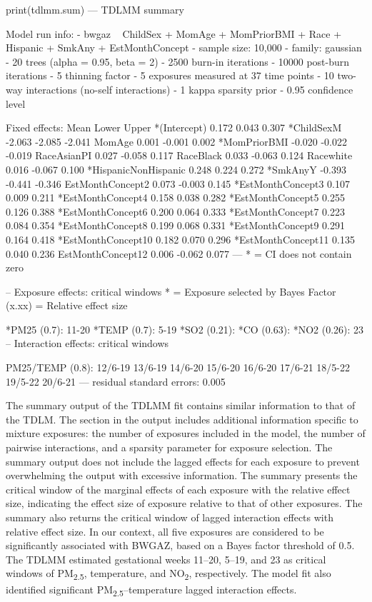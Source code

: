 \begin{example}
print(tdlmm.sum)
---
TDLMM summary

Model run info:
- bwgaz ~ ChildSex + MomAge + MomPriorBMI + Race + Hispanic + SmkAny + EstMonthConcept
- sample size: 10,000
- family: gaussian
- 20 trees (alpha = 0.95, beta = 2)
- 2500 burn-in iterations
- 10000 post-burn iterations
- 5 thinning factor
- 5 exposures measured at 37 time points
- 10 two-way interactions (no-self interactions)
- 1 kappa sparsity prior
- 0.95 confidence level

Fixed effects:
                       Mean  Lower  Upper
*(Intercept)          0.172  0.043  0.307
*ChildSexM           -2.063 -2.085 -2.041
 MomAge               0.001 -0.001  0.002
*MomPriorBMI         -0.020 -0.022 -0.019
 RaceAsianPI          0.027 -0.058  0.117
 RaceBlack            0.033 -0.063  0.124
 Racewhite            0.016 -0.067  0.100
*HispanicNonHispanic  0.248  0.224  0.272
*SmkAnyY             -0.393 -0.441 -0.346
 EstMonthConcept2     0.073 -0.003  0.145
*EstMonthConcept3     0.107  0.009  0.211
*EstMonthConcept4     0.158  0.038  0.282
*EstMonthConcept5     0.255  0.126  0.388
*EstMonthConcept6     0.200  0.064  0.333
*EstMonthConcept7     0.223  0.084  0.354
*EstMonthConcept8     0.199  0.068  0.331
*EstMonthConcept9     0.291  0.164  0.418
*EstMonthConcept10    0.182  0.070  0.296
*EstMonthConcept11    0.135  0.040  0.236
 EstMonthConcept12    0.006 -0.062  0.077
---
* = CI does not contain zero

--
Exposure effects: critical windows
* = Exposure selected by Bayes Factor
(x.xx) = Relative effect size

 *PM25 (0.7): 11-20
 *TEMP (0.7): 5-19
 *SO2 (0.21):
 *CO (0.63):
 *NO2 (0.26): 23
--
Interaction effects: critical windows

 PM25/TEMP (0.8):
 12/6-19
 13/6-19
 14/6-20
 15/6-20
 16/6-20
 17/6-21
 18/5-22
 19/5-22
 20/6-21
---
residual standard errors: 0.005
\end{example}

The summary output of the TDLMM fit contains similar information to that of the TDLM. The  section in the output includes additional information specific to mixture exposures: the number of exposures included in the model, the number of pairwise interactions, and a sparsity parameter for exposure selection. The summary output does not include the lagged effects for each exposure to prevent overwhelming the output with excessive information. The summary presents the critical window of the marginal effects of each exposure with the relative effect size, indicating the effect size of exposure relative to that of other exposures. The summary also returns the critical window of lagged interaction effects with relative effect size. In our context, all five exposures are considered to be significantly associated with BWGAZ, based on a Bayes factor threshold of 0.5. The TDLMM estimated gestational weeks 11--20, 5--19, and 23 as critical windows of PM\textsubscript{2.5}, temperature, and NO\textsubscript{2}, respectively. The model fit also identified significant PM\textsubscript{2.5}--temperature lagged interaction effects.

